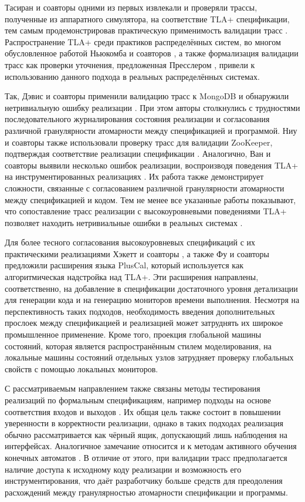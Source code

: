 Тасиран и соавторы одними из первых извлекали и проверяли трассы,
полученные из аппаратного симулятора, на соответствие TLA+
спецификации, тем самым продемонстрировав практическую применимость
валидации трасс \cite{tasiran2002using}. Распространение TLA+ среди
практиков распределённых систем, во многом обусловленное работой
Ньюкомба и соавторов \cite{newcombe2015aws}, а также формализация
валидации трасс как проверки уточнения, предложенная Пресслером
\cite{pressler2020conjunction}, привели к использованию данного
подхода в реальных распределённых системах.

Так, Дэвис и соавторы применили валидацию трасс к MongoDB и
обнаружили нетривиальную ошибку реализации
\cite{davis2020extreme}. При этом авторы столкнулись с трудностями
последовательного журналирования состояния реализации и согласования
различной гранулярности атомарности между спецификацией и программой.
Ниу и соавторы также использовали проверку трасс для валидации
ZooKeeper, подтверждая соответствие реализации спецификации
\cite{niu2022zookeeper}. Аналогично, Ван и соавторы выявили несколько
ошибок реализации, воспроизводя поведения TLA+ на инструментированных
реализациях \cite{wang2023model}. Их работа также демонстрирует
сложности, связанные с согласованием различной гранулярности
атомарности между спецификацией и кодом. Тем не менее все указанные
работы показывают, что сопоставление трасс реализации с
высокоуровневыми поведениями TLA+ позволяет находить нетривиальные
ошибки в реальных системах \cite{ongaro2014search}.

Для более тесного согласования высокоуровневых спецификаций с их
практическими реализациями Хэкетт и соавторы
\cite{hackett2023pgo}, а также Фу и соавторы
\cite{foo2023choreographic} предложили расширения языка PlusCal,
который используется как алгоритмическая надстройка над TLA+. Эти
расширения направлены, соответственно, на добавление в спецификации
достаточного уровня детализации для генерации кода и на генерацию
мониторов времени выполнения. Несмотря на перспективность таких
подходов, необходимость введения дополнительных прослоек между
спецификацией и реализацией может затруднять их широкое промышленное
применение. Кроме того, проекция глобальной машины состояний, которая
является распространённым стилем моделирования, на локальные машины
состояний отдельных узлов затрудняет проверку глобальных свойств с
помощью локальных мониторов.

С рассматриваемым направлением также связаны методы тестирования
реализаций по формальным спецификациям, например подходы на основе
соответствия входов и выходов \cite{tretmans1996test}. Их общая цель
также состоит в повышении уверенности в корректности реализации, однако
в таких подходах реализация обычно рассматривается как чёрный ящик,
допускающий лишь наблюдения на интерфейсах. Аналогичное замечание
относится и к методам активного обучения конечных автоматов
\cite{vaandrager2017modellearning}. В отличие от этого, при валидации
трасс предполагается наличие доступа к исходному коду реализации и
возможность его инструментирования, что даёт разработчику больше
средств для преодоления расхождений между гранулярностью атомарности
спецификации и программы.

